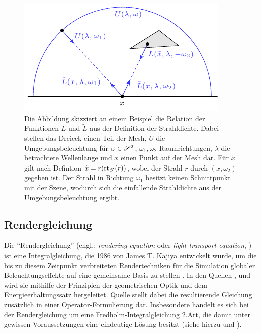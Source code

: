 		\begin{figure}
			\center
			\includegraphics{gg_fig/lte-incident_and_emitted_radiance.pdf}
			\caption[Relation zwischen der ein- und ausfallenden Strahldichte]{Die Abbildung skizziert an einem Beispiel die Relation der Funktionen $L$ und $\tilde{L}$ aus der Definition der Strahldichte. Dabei stellen das Dreieck einen Teil der Mesh, $U$ die Umgebungsbeleuchtung für $\omega\in\mathscr{S}^{2}$, $\omega_1,\omega_2$ Raumrichtungen, $\lambda$ die betrachtete Wellenlänge und $x$ einen Punkt auf der Mesh dar. Für $\tilde{x}$ gilt nach Defintion $\tilde{x}=r(\mathrm{rt}_{\mathscr{T}}(r))$, wobei der Strahl $r$ durch $(x,\omega_2)$ gegeben ist. Der Strahl in Richtung $\omega_1$ besitzt keinen Schnittpunkt mit der Szene, wodurch sich die einfallende Strahldichte aus der Umgebungsbeleuchtung ergibt.}
			\label{fig:lte-incident-emitted-radiance}
		\end{figure}


	\subsection{Rendergleichung} %
	\label{sub:rendergleichung}

		Die \enquote{Rendergleichung} (engl.: \textit{rendering equation} oder \textit{light transport equation}, \cite[S.~861]{pbrt3}) ist eine Integralgleichung, die 1986 von James T. Kajiya entwickelt wurde, um die bis zu diesem Zeitpunkt verbreiteten Rendertechniken für die Simulation globaler Beleuchtungseffekte auf eine gemeinsame Basis zu stellen \cite{kajiya-lte}.
		In den Quellen \cite{kajiya-lte}, \cite[S.~349~ff,~862~ff]{pbrt3} und \cite{veach-thesis} wird sie mithilfe der Prinzipien der geometrischen Optik und dem Energieerhaltungssatz hergeleitet.
		Quelle \cite{veach-thesis} stellt dabei die resultierende Gleichung zusätzlich in einer Operator-Formulierung dar.
		Insbesondere handelt es sich bei der Rendergleichung um eine Fredholm-Integralgleichung 2.Art, die damit unter gewissen Voraussetzungen eine eindeutige Lösung besitzt (siehe hierzu \cite[S.~103~ff]{veach-thesis} und \cite{integral-equations}).

